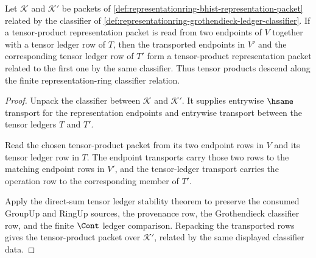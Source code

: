 \begin{theorem}
\label{thm:representationring-tensor-product-descent}
Let $\mathcal{K}$ and $\mathcal{K}'$ be packets of
\autoref{def:representationring-bhist-representation-packet} related by the
classifier of
\autoref{def:representationring-grothendieck-ledger-classifier}. If a
tensor-product representation packet is read from two endpoints of $V$ together
with a tensor ledger row of $T$, then the transported endpoints in $V'$ and the
corresponding tensor ledger row of $T'$ form a tensor-product representation
packet related to the first one by the same classifier. Thus tensor products
descend along the finite representation-ring classifier relation.
\end{theorem}
\begin{proof}
Unpack the classifier between $\mathcal{K}$ and $\mathcal{K}'$. It supplies
entrywise $\hsame$ transport for the representation endpoints and entrywise
transport between the tensor ledgers $T$ and $T'$.

Read the chosen tensor-product packet from its two endpoint rows in $V$ and its
tensor ledger row in $T$. The endpoint transports carry those two rows to the
matching endpoint rows in $V'$, and the tensor-ledger transport carries the
operation row to the corresponding member of $T'$.

Apply the direct-sum tensor ledger stability theorem to preserve the consumed
GroupUp and RingUp sources, the provenance row, the Grothendieck classifier
row, and the finite $\Cont$ ledger comparison. Repacking the transported rows
gives the tensor-product packet over $\mathcal{K}'$, related by the same
displayed classifier data.
\end{proof}


